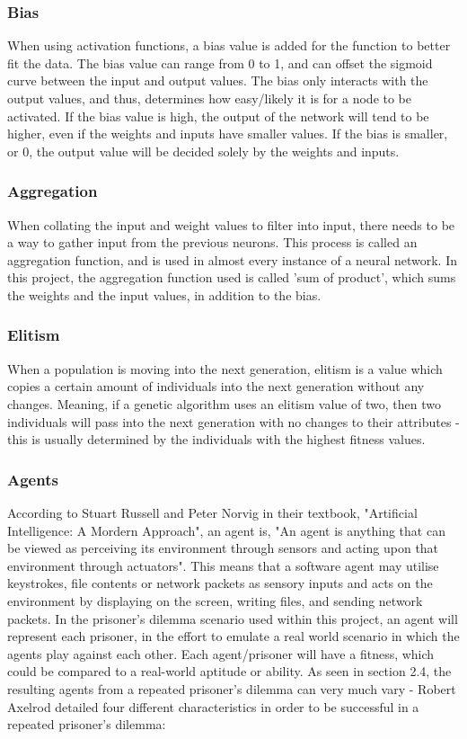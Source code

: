 \documentclass[12pt,a4paper]{article}
\begin{document}
\subsubsection{Bias}
When using activation functions, a bias value is added for the function to better fit the data. The bias value can range from 0 to 1, and can offset the sigmoid curve between the input and output values. The bias only interacts with the output values, and thus, determines how easy/likely it is for a node to be activated. If the bias value is high, the output of the network will tend to be higher, even if the weights and inputs have smaller values. If the bias is smaller, or 0, the output value will be decided solely by the weights and inputs.

\subsubsection{Aggregation}
When collating the input and weight values to filter into input, there needs to be a way to gather input from the previous neurons. This process is called an aggregation function, and is used in almost every instance of a neural network. In this project, the aggregation function used is called 'sum of product', which sums the weights and the input values, in addition to the bias.

\subsubsection{Elitism}
When a population is moving into the next generation, elitism is a value which copies a certain amount of individuals into the next generation without any changes. Meaning, if a genetic algorithm uses an elitism value of two, then two individuals will pass into the next generation with no changes to their attributes - this is usually determined by the individuals with the highest fitness values.

\subsubsection{Agents}
According to Stuart Russell and Peter Norvig in their textbook, "Artificial Intelligence: A Mordern Approach", an agent is, "An agent is anything that can be viewed as perceiving its environment through sensors and acting upon that environment through actuators". This means that a software agent may utilise keystrokes, file contents or network packets as sensory inputs and acts on the environment by displaying on the screen, writing files, and sending network packets. In the prisoner's dilemma scenario used within this project, an agent will represent each prisoner, in the effort to emulate a real world scenario in which the agents play against each other. Each agent/prisoner will have a fitness, which could be compared to a real-world aptitude or ability. As seen in section 2.4, the resulting agents from a repeated prisoner's dilemma can very much vary - Robert Axelrod detailed four different characteristics in order to be successful in a repeated prisoner's dilemma:
\end{document}
